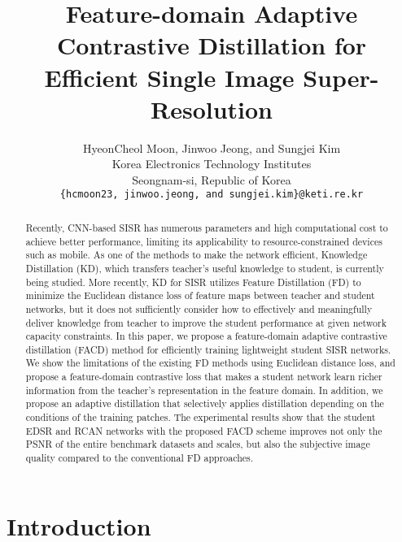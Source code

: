 \documentclass[10pt,twocolumn,letterpaper]{article}
\begin{document}
\title{Feature-domain Adaptive Contrastive Distillation for Efficient Single Image Super-Resolution}

\author{HyeonCheol Moon, Jinwoo Jeong, and Sungjei Kim \\
Korea Electronics Technology Institutes\\
Seongnam-si, Republic of Korea\\
{\tt\small \{hcmoon23, jinwoo.jeong, and sungjei.kim\}@keti.re.kr}
}

\ificcvfinal\thispagestyle{empty}\fi

\maketitle

\begin{abstract}
Recently, CNN-based SISR has numerous parameters and high computational cost to achieve better performance, limiting its applicability to resource-constrained devices such as mobile. As one of the methods to make the network efficient, Knowledge Distillation (KD), which transfers teacher's useful knowledge to student, is currently being studied. More recently, KD for SISR utilizes Feature Distillation (FD) to minimize the Euclidean distance loss of feature maps between teacher and student networks, but it does not sufficiently consider how to effectively and meaningfully deliver knowledge from teacher to improve the student performance at given network capacity constraints. In this paper, we propose a feature-domain adaptive contrastive distillation (FACD) method for efficiently training lightweight student SISR networks. We show the limitations of the existing FD methods using Euclidean distance loss, and propose a feature-domain contrastive loss that makes a student network learn richer information from the teacher's representation in the feature domain. In addition, we propose an adaptive distillation that selectively applies distillation depending on the conditions of the training patches. The experimental results show that the student EDSR and RCAN networks with the proposed FACD scheme improves not only the PSNR of the entire benchmark datasets and scales, but also the subjective image quality compared to the conventional FD approaches.

\end{abstract}

\section{Introduction}
\label{sec:intro}
\end{document}
